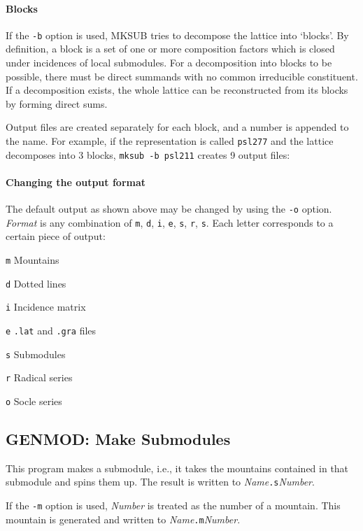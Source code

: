 \paragraph{Blocks}
If the {\tt -b} option is used, MKSUB tries to decompose the lattice
into `blocks'. By definition, a block is a set of one or more
composition factors which is closed under incidences of local
submodules. For a decomposition into blocks to be possible, there 
must be direct summands with no common irreducible constituent.
If a decomposition exists, the whole lattice can be reconstructed
from its blocks by forming direct sums.

Output files are created separately for each block, and a number
is appended to the name. For example, if the representation is
called {\tt psl277} and the lattice decomposes into 3 blocks,
{\tt mksub~-b~psl211} creates 9 output files:


\paragraph{Changing the output format}
The default output as shown above may be changed by using the
{\tt -o} option. {\it Format} is any combination of {\tt m},
{\tt d}, {\tt i}, {\tt e}, {\tt s}, {\tt r}, {\tt s}. Each
letter corresponds to a certain piece of output:
\begin{list}{}{\parsep 0mm
\itemsep 0mm}
\item[{\tt m}\hfill] Mountains
\item[{\tt d}\hfill] Dotted lines
\item[{\tt i}\hfill] Incidence matrix
\item[{\tt e}\hfill] {\tt .lat} and {\tt .gra} files
\item[{\tt s}\hfill] Submodules
\item[{\tt r}\hfill] Radical series
\item[{\tt o}\hfill] Socle series
\end{list}


\subsection{GENMOD: Make Submodules}
\Syntax
{}

\Description
This program makes a submodule, i.e., it takes the mountains
contained in that submodule and spins them up. The result
is written to {\it Name}{\tt .s}{\it Number}.

If the {\tt -m} option is used, {\it Number} is treated as the
number of a mountain. This mountain is generated and written
to {\it Name}{\tt .m}{\it Number}.



